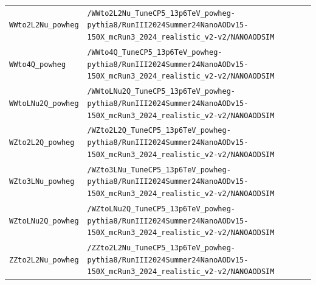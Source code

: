 \begin{longtable}{@{}>{\RaggedRight\arraybackslash}p{} >{\RaggedRight\arraybackslash}p{}@{}}
\addlinespace[2pt]
\texttt{WWto2L2Nu\_\allowbreak{}powheg} & \texttt{/\allowbreak{}WWto2L2Nu\_\allowbreak{}TuneCP5\_\allowbreak{}13p6TeV\_\allowbreak{}powheg-\allowbreak{}pythia8/\allowbreak{}RunIII2024Summer24NanoAODv15-\allowbreak{}150X\_\allowbreak{}mcRun3\_\allowbreak{}2024\_\allowbreak{}realistic\_\allowbreak{}v2-\allowbreak{}v2/\allowbreak{}NANOAODSIM} \\
\addlinespace[2pt]
\texttt{WWto4Q\_\allowbreak{}powheg} & \texttt{/\allowbreak{}WWto4Q\_\allowbreak{}TuneCP5\_\allowbreak{}13p6TeV\_\allowbreak{}powheg-\allowbreak{}pythia8/\allowbreak{}RunIII2024Summer24NanoAODv15-\allowbreak{}150X\_\allowbreak{}mcRun3\_\allowbreak{}2024\_\allowbreak{}realistic\_\allowbreak{}v2-\allowbreak{}v2/\allowbreak{}NANOAODSIM} \\
\addlinespace[2pt]
\texttt{WWtoLNu2Q\_\allowbreak{}powheg} & \texttt{/\allowbreak{}WWtoLNu2Q\_\allowbreak{}TuneCP5\_\allowbreak{}13p6TeV\_\allowbreak{}powheg-\allowbreak{}pythia8/\allowbreak{}RunIII2024Summer24NanoAODv15-\allowbreak{}150X\_\allowbreak{}mcRun3\_\allowbreak{}2024\_\allowbreak{}realistic\_\allowbreak{}v2-\allowbreak{}v2/\allowbreak{}NANOAODSIM} \\
\addlinespace[2pt]
\texttt{WZto2L2Q\_\allowbreak{}powheg} & \texttt{/\allowbreak{}WZto2L2Q\_\allowbreak{}TuneCP5\_\allowbreak{}13p6TeV\_\allowbreak{}powheg-\allowbreak{}pythia8/\allowbreak{}RunIII2024Summer24NanoAODv15-\allowbreak{}150X\_\allowbreak{}mcRun3\_\allowbreak{}2024\_\allowbreak{}realistic\_\allowbreak{}v2-\allowbreak{}v2/\allowbreak{}NANOAODSIM} \\
\addlinespace[2pt]
\texttt{WZto3LNu\_\allowbreak{}powheg} & \texttt{/\allowbreak{}WZto3LNu\_\allowbreak{}TuneCP5\_\allowbreak{}13p6TeV\_\allowbreak{}powheg-\allowbreak{}pythia8/\allowbreak{}RunIII2024Summer24NanoAODv15-\allowbreak{}150X\_\allowbreak{}mcRun3\_\allowbreak{}2024\_\allowbreak{}realistic\_\allowbreak{}v2-\allowbreak{}v2/\allowbreak{}NANOAODSIM} \\
\addlinespace[2pt]
\texttt{WZtoLNu2Q\_\allowbreak{}powheg} & \texttt{/\allowbreak{}WZtoLNu2Q\_\allowbreak{}TuneCP5\_\allowbreak{}13p6TeV\_\allowbreak{}powheg-\allowbreak{}pythia8/\allowbreak{}RunIII2024Summer24NanoAODv15-\allowbreak{}150X\_\allowbreak{}mcRun3\_\allowbreak{}2024\_\allowbreak{}realistic\_\allowbreak{}v2-\allowbreak{}v2/\allowbreak{}NANOAODSIM} \\
\addlinespace[2pt]
\texttt{ZZto2L2Nu\_\allowbreak{}powheg} & \texttt{/\allowbreak{}ZZto2L2Nu\_\allowbreak{}TuneCP5\_\allowbreak{}13p6TeV\_\allowbreak{}powheg-\allowbreak{}pythia8/\allowbreak{}RunIII2024Summer24NanoAODv15-\allowbreak{}150X\_\allowbreak{}mcRun3\_\allowbreak{}2024\_\allowbreak{}realistic\_\allowbreak{}v2-\allowbreak{}v2/\allowbreak{}NANOAODSIM} \\

\end{longtable}
